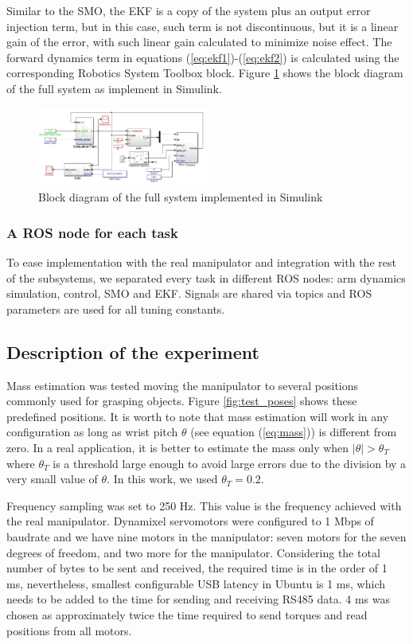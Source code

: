 \documentclass[conference,letterpaper]{ieeeconf}
\begin{document}
Similar to the SMO, the EKF is a copy of the system plus an output error injection term, but in this case, such term is not discontinuous, but it is a linear gain of the error, with such linear gain calculated to minimize noise effect. The forward dynamics term in equations (\ref{eq:ekf1})-(\ref{eq:ekf2}) is calculated using the corresponding Robotics System Toolbox block. Figure \ref{fig:FullSystemSimulink} shows the block diagram of the full system as implement in Simulink. 

\begin{figure}
  \centering
  \includegraphics[width=0.5\textwidth]{Figures/MassEstimatorDiagram.jpg}
  \caption{Block diagram of the full system implemented in Simulink}
  \label{fig:FullSystemSimulink}
\end{figure}

\subsubsection*{A ROS node for each task}
To ease implementation with the real manipulator and integration with the rest of the subsystems, we separated every task in different ROS nodes: arm dynamics simulation, control, SMO and EKF. Signals are shared via topics and ROS parameters are used for all tuning constants. 

\subsection{Description of the experiment}
Mass estimation was tested moving the manipulator to several positions commonly used for grasping objects. Figure \ref{fig:test_poses} shows these predefined positions. It is worth to note that mass estimation will work in any configuration as long as wrist pitch $\theta$ (see equation (\ref{eq:mass})) is different from zero. In a real application, it is better to estimate the mass only when $\vert\theta\vert > \theta_T$ where $\theta_T$ is a threshold large enough to avoid large errors due to the division by a very small value of $\theta$. In this work, we used $\theta_T=0.2$. 

Frequency sampling was set to 250 Hz. This value is the frequency achieved with the real manipulator. Dynamixel servomotors were configured to 1 Mbps of baudrate and we have nine motors in the manipulator: seven motors for the seven degrees of freedom, and two more for the manipulator. Considering the total number of bytes to be sent and received, the required time is in the order of 1 ms, nevertheless, smallest configurable USB latency in Ubuntu is 1 ms, which needs to be added to the time for sending and receiving RS485 data. 4 ms was chosen as approximately twice the time required to send torques and read positions from all motors. 
\end{document}
